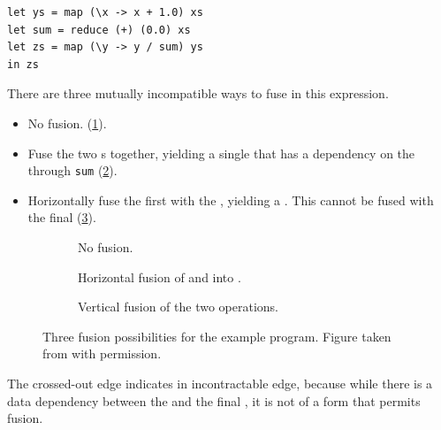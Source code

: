 \begin{lstlisting}
let ys = map (\x -> x + 1.0) xs
let sum = reduce (+) (0.0) xs
let zs = map (\y -> y / sum) ys
in zs
\end{lstlisting}

There are three mutually incompatible ways to fuse in this expression.

\begin{itemize}
\item No fusion. (\cref{fig:three-fusion-no-fusion}).
\item Fuse the two s together, yielding a single  that
  has a dependency on the  through \texttt{sum}
  (\cref{fig:three-fusion-map-map}).
\item Horizontally fuse the first  with the ,
  yielding a .  This  cannot be fused with the
  final  (\cref{fig:three-fusion-map-reduce}).
\end{itemize}

\begin{figure}
  \centering

  \begin{subfigure}[t]{0.32\textwidth}
      
      \caption{No fusion.}
      \label{fig:three-fusion-no-fusion}
  \end{subfigure}
  \begin{subfigure}[t]{0.32\textwidth}
    
    \caption{Horizontal fusion of  and  into .}
      \label{fig:three-fusion-map-map}
  \end{subfigure}
  \begin{subfigure}[t]{0.32\textwidth}
    
    \caption{Vertical fusion of the two  operations.}
      \label{fig:three-fusion-map-reduce}
  \end{subfigure}


  \caption{Three fusion possibilities for the example program. Figure
    taken from \cite{dybdal2017array} with permission.}
  \label{fig:three-fusion-opportunities}
\end{figure}

The crossed-out edge indicates in incontractable edge, because while
there is a data dependency between the  and the final
, it is not of a form that permits fusion.

